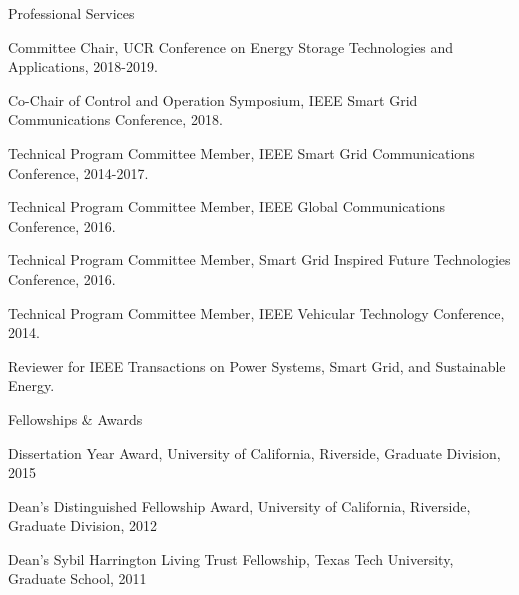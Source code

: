 \documentclass{resume} %
\begin{document}
\begin{rSection}{Professional Services}
\item  Committee Chair,  UCR Conference on  Energy Storage Technologies and Applications, 2018-2019.
\item  Co-Chair of Control and Operation Symposium, IEEE Smart Grid Communications Conference, 2018.
\item  Technical Program Committee  Member, IEEE Smart Grid Communications Conference, 2014-2017.
\item   Technical Program Committee Member, IEEE Global Communications Conference, 2016.
\item Technical Program Committee Member, Smart Grid Inspired Future Technologies Conference, 2016.
\item  Technical Program Committee Member, IEEE Vehicular Technology Conference, 2014.
\item  Reviewer for IEEE Transactions on Power Systems,  Smart Grid, and Sustainable Energy.

\end{rSection}


\begin{rSection}{Fellowships \& Awards}

\item [] Dissertation Year Award, University of California, Riverside, Graduate Division, 2015

\item [] Dean's Distinguished Fellowship Award, University of California, Riverside, Graduate Division, 2012

\item [] Dean’s Sybil Harrington Living Trust Fellowship, Texas Tech University, Graduate School, 2011

\end{rSection}
\end{document}
